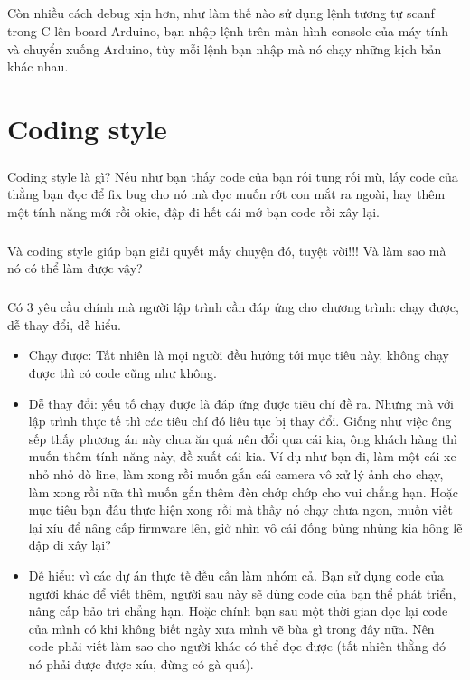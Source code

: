 \documentclass[12pt,a5paper]{book}
\begin{document}
\paragraph{}
Còn nhiều cách debug xịn hơn, như làm thế nào sử dụng lệnh tương tự scanf trong C lên board Arduino, bạn nhập lệnh trên màn hình console của máy tính và chuyển xuống Arduino, tùy mỗi lệnh bạn nhập mà nó chạy những kịch bản khác nhau.
\paragraph{}
\chapter{Coding style}
\paragraph{}
Coding style là gì? Nếu như bạn thấy code của bạn rối tung rối mù, lấy code của thằng bạn đọc để fix bug cho nó mà đọc muốn rớt con mắt ra ngoài, hay thêm một tính năng mới rồi okie, đập đi hết cái mớ bạn code rồi xây lại.
\paragraph{}
Và coding style giúp bạn giải quyết mấy chuyện đó, tuyệt vời!!! Và làm sao mà nó có thể làm được vậy?
\paragraph{}
Có 3 yêu cầu chính mà người lập trình cần đáp ứng cho chương trình: chạy được, dễ thay đổi, dễ hiểu.
\begin{itemize}
  \item Chạy được: Tất nhiên là mọi người đều hướng tới mục tiêu này, không chạy được thì có code cũng như không.
  \item Dễ thay đổi: yếu tố chạy được là đáp ứng được tiêu chí đề ra. Nhưng mà với lập trình thực tế thì các tiêu chí đó liêu tục bị thay đổi. Giống như việc ông sếp thấy phương án này chua ăn quá nên đổi qua cái kia, ông khách hàng thì muốn thêm tính năng này, đề xuất cái kia. Ví dụ như bạn đi, làm một cái xe nhỏ nhỏ dò line, làm xong rồi muốn gắn cái camera vô xử lý ảnh cho chạy, làm xong rồi nữa thì muốn gắn thêm đèn chớp chớp cho vui chẳng hạn. Hoặc mục tiêu bạn đâu thực hiện xong rồi mà thấy nó chạy chưa ngon, muốn viết lại xíu để nâng cấp firmware lên, giờ nhìn vô cái đống bùng nhùng kia hông lẽ đập đi xây lại?
	\item Dễ hiểu: vì các dự án thực tế đều cần làm nhóm cả. Bạn sử dụng code của người khác để viết thêm, người sau này sẽ dùng code của bạn thể phát triển, nâng cấp bảo trì chẳng hạn. Hoặc chính bạn sau một thời gian đọc lại code của mình có khi không biết ngày xưa mình vẽ bùa gì trong đây nữa. Nên code phải viết làm sao cho người khác có thể đọc được (tất nhiên thằng đó nó phải được được xíu, đừng có gà quá).
\end{itemize}
\end{document}
